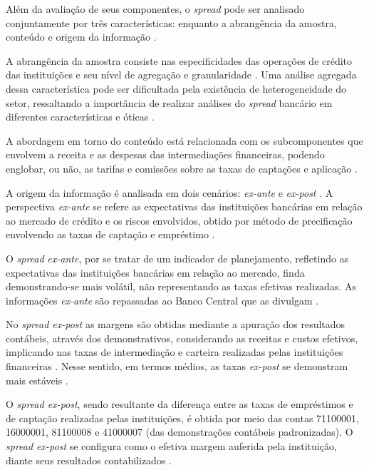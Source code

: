 \documentclass[12pt,12pt,openright,oneside,a4paper,chapter=TITLE,section=TITLE,subsection=TITLE,subsubsection=TITLE english,french,spanish,portugues,sumario=tradicional]{abntex2}
\begin{document}
Além da avaliação de seus componentes, o \emph{spread} pode ser analisado
conjuntamente por três características: enquanto a abrangência da amostra,
conteúdo e origem da informação \cite{leal:2006}.

A abrangência da amostra consiste nas especificidades das operações de crédito
das instituições e seu nível de agregação e granularidade
\cite{costa;nakane:2004}. Uma análise agregada dessa característica pode ser
dificultada pela existência de heterogeneidade do setor, ressaltando a
importância de realizar análises do \emph{spread} bancário em diferentes
características e óticas \cite{block:2000}.

A abordagem em torno do conteúdo está relacionada com os subcomponentes que
envolvem a receita e as despesas das intermediações financeiras, podendo
englobar, ou não, as tarifas e comissões sobre as taxas de captações e
aplicação \cite{block:2000}.

A origem da informação é analisada em dois cenários: \emph{ex-ante} e \emph{ex-post}
\cite{kunt:1999, levine:1997}. A perspectiva \emph{ex-ante} se refere as
expectativas das instituições bancárias em relação ao mercado de crédito e os
riscos envolvidos, obtido por método de precificação envolvendo as taxas de
captação e empréstimo \cite{durigan:2018, leal:2006, dantas:2012}.

O \emph{spread} \emph{ex-ante}, por se tratar de um indicador de planejamento, refletindo
as expectativas das instituições bancárias em relação ao mercado, finda
demonstrando-se mais volátil, não representando as taxas efetivas realizadas.
As informações \emph{ex-ante} são repassadas ao Banco Central que as divulgam
\cite{durigan:2018, leal:2006, dantas:2012}.

No \emph{spread ex-post} as margens são obtidas mediante a apuração dos resultados
contábeis, através dos demonstrativos, considerando as receitas e custos
efetivos, implicando nas taxas de intermediação e carteira realizadas pelas
instituições financeiras \cite{kunt:1999, durigan:2018}. Nesse sentido, em
termos médios, as taxas \emph{ex-post} se demonstram mais estáveis \cite{leal:2006, dantas:2012}.

O \emph{spread ex-post}, sendo resultante da diferença entre as taxas de empréstimos e de captação realizadas pelas instituições, é obtida por meio das contas 71100001, 16000001, 81100008 e 41000007 (das demonstrações contábeis padronizadas). O \emph{spread ex-post} se configura como o efetiva margem auferida pela instituição, diante seus resultados contabilizados \cite{dantas:2012}.
\end{document}
